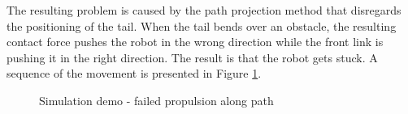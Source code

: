 The resulting problem is caused by the path projection method that disregards the positioning of the tail. When the tail bends over an obstacle, the resulting contact force pushes the robot in the wrong direction while the front link is pushing it in the right direction. The result is that the robot gets stuck. A sequence of the movement is presented in Figure \ref{fig:case2-4}.

\begin{figure}[H]
    \centering
    
    \hfil
    
    \hfil

    \caption{Simulation demo - failed propulsion along path}
    \label{fig:case2-4}
\end{figure}







